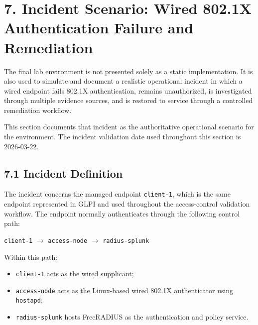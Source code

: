 \documentclass[11pt]{article}
\begin{document}
\section{7. Incident Scenario: Wired 802.1X Authentication Failure and Remediation}
\label{sec:incident-scenario-wired-8021x-authentication-failure-and-remediation}

The final lab environment is not presented solely as a static implementation. It is also used to simulate and document a realistic operational incident in which a wired endpoint fails 802.1X authentication, remains unauthorized, is investigated through multiple evidence sources, and is restored to service through a controlled remediation workflow.

This section documents that incident as the authoritative operational scenario for the environment. The incident validation date used throughout this section is 2026-03-22.


\subsection{7.1 Incident Definition}
\label{sec:incident-definition}

The incident concerns the managed endpoint \texttt{client-1}, which is the same endpoint represented in GLPI and used throughout the access-control validation workflow. The endpoint normally authenticates through the following control path:

\begin{center}
\texttt{client-1} $\rightarrow$ \texttt{access-node} $\rightarrow$ \texttt{radius-splunk}
\end{center}

Within this path:

\begin{itemize}
    \item \texttt{client-1} acts as the wired supplicant;
    \item \texttt{access-node} acts as the Linux-based wired 802.1X authenticator using \texttt{hostapd};
    \item \texttt{radius-splunk} hosts FreeRADIUS as the authentication and policy service.
\end{itemize}
\end{document}
